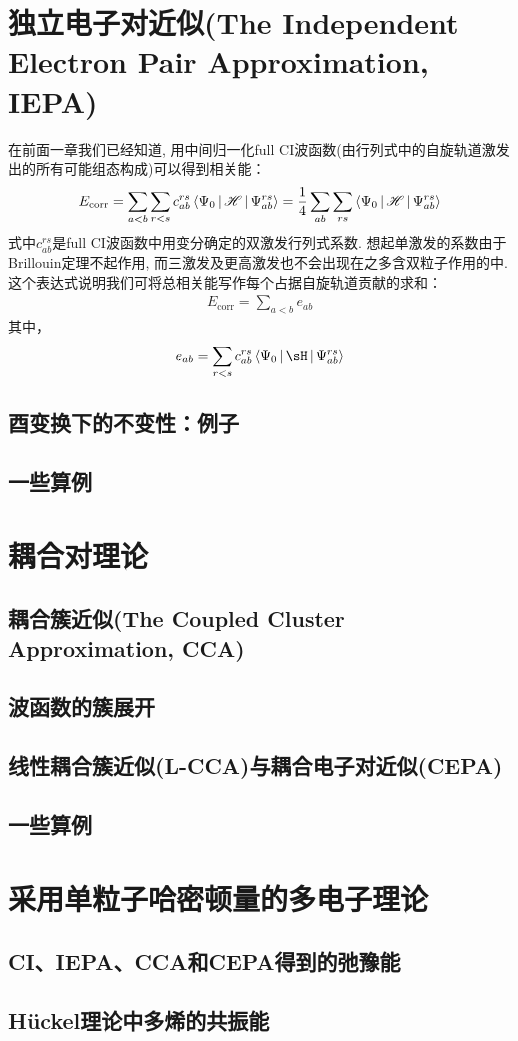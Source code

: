 \section{独立电子对近似(The Independent Electron Pair Approximation, IEPA)}
在前面一章我们已经知道, 用中间归一化full CI波函数(由\hft 行列式中的自旋轨道激发出的所有可能组态构成)可以得到相关能：
\begin{align}
E_\mathrm{corr} = \sum_{a<b}\sum_{r<s}c_{ab}^{rs}\Braket{\Psi_0|\mathscr{H}|\Psi_{ab}^{rs}} = \frac{1}{4}\sum_{ab}\sum_{rs}\Braket{\Psi_0|\mathscr{H}|\Psi_{ab}^{rs}}
\end{align}
式中$c_{ab}^{rs}$是full CI波函数中用变分确定的双激发行列式系数. 想起单激发的系数由于Brillouin定理不起作用, 而三激发及更高激发也不会出现在之多含双粒子作用的\ha 中. 这个表达式说明我们可将总相关能写作每个占据自旋轨道贡献的求和：
\begin{align}
E_\mathrm{corr} = \sum_{a<b}e_{ab}
\end{align}
其中，
\begin{equation}\label{key}
e_{ab} = \sum_{r<s} c_{ab}^{rs} \Braket{\Psi_0 | \sH | \Psi_{ab}^{rs}}
\end{equation}
\subsection{酉变换下的不变性：例子}
\subsection{一些算例}

\section{耦合对理论}
\subsection{耦合簇近似(The Coupled Cluster Approximation, CCA)}
\subsection{波函数的簇展开}
\subsection{线性耦合簇近似(L-CCA)与耦合电子对近似(CEPA)}
\subsection{一些算例}

\section{采用单粒子哈密顿量的多电子理论}
\subsection{CI、IEPA、CCA和CEPA得到的弛豫能}
\subsection{H\"uckel理论中多烯的共振能}